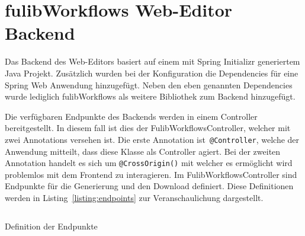 \section{fulibWorkflows Web-Editor Backend}\label{sec:editor-backend}
Das Backend des Web-Editors basiert auf einem mit Spring Initializr generiertem Java Projekt.
Zusätzlich wurden bei der Konfiguration die Dependencies für eine Spring Web Anwendung hinzugefügt.
Neben den eben genannten Dependencies wurde lediglich fulibWorkflows als weitere Bibliothek zum Backend hinzugefügt.

Die verfügbaren Endpunkte des Backends werden in einem Controller bereitgestellt.
In diesem fall ist dies der FulibWorkflowsController, welcher mit zwei Annotations versehen ist.
Die erste Annotation ist~\texttt{@Controller}, welche der Anwendung mitteilt, dass diese Klasse als Controller agiert.
Bei der zweiten Annotation handelt es sich um \texttt{@CrossOrigin()} mit welcher es ermöglicht wird problemlos mit dem
Frontend zu interagieren.
Im FulibWorkflowsController sind Endpunkte für die Generierung und den Download definiert.
Diese Definitionen werden in Listing~\ref{listing:endpoints} zur Veranschaulichung dargestellt.

\begin{listing}[!ht]
    \inputminted[xleftmargin=20pt,linenos,firstnumber=15]{java}{listings/3.3/Endpoints.java}
    \caption{Definition der Endpunkte}
    \label{listing:endpoints}
\end{listing}




